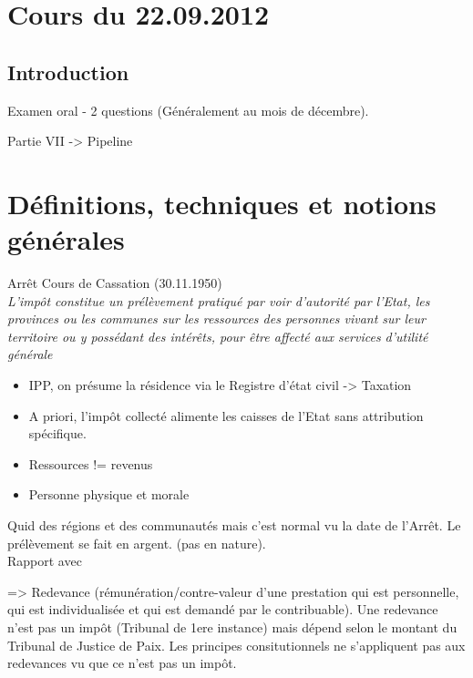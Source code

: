 \documentclass{book}
\begin{document}
\thispagestyle{empty}
\setcounter{page}{0}
\null
\newpage
{} \setcounter{page}{1} 




\tableofcontents



\chapter{Cours du 22.09.2012}
 \setcounter{page}{1} 

\section{Introduction}

Examen oral - 2 questions (Généralement au mois de décembre).

Partie VII -> Pipeline

\chapter{Définitions, techniques et notions générales}


Arrêt Cours de Cassation (30.11.1950)\\

\textit{L'impôt constitue un prélèvement pratiqué par voir d'autorité par l'Etat, les provinces ou les communes sur les ressources des personnes vivant sur leur territoire ou y possédant des intérêts, pour être affecté aux services d'utilité générale}\\

\begin{itemize}
\item IPP, on présume la résidence via le Registre d'état civil -> Taxation
\item A priori, l'impôt collecté alimente les caisses de l'Etat sans attribution spécifique.
\item Ressources != revenus
\item Personne physique et morale
\end{itemize}
\null
Quid des régions et des communautés mais c'est normal vu la date de l'Arrêt. Le prélèvement se fait en argent. (pas en nature).\\

Rapport avec

=> Redevance (rémunération/contre-valeur d'une prestation qui est personnelle, qui est individualisée et qui est demandé par le contribuable). Une redevance n'est pas un impôt (Tribunal de 1ere instance) mais dépend selon le montant du Tribunal de Justice de Paix. Les principes consitutionnels ne s'appliquent pas aux redevances vu que ce n'est pas un impôt.
\end{document}

